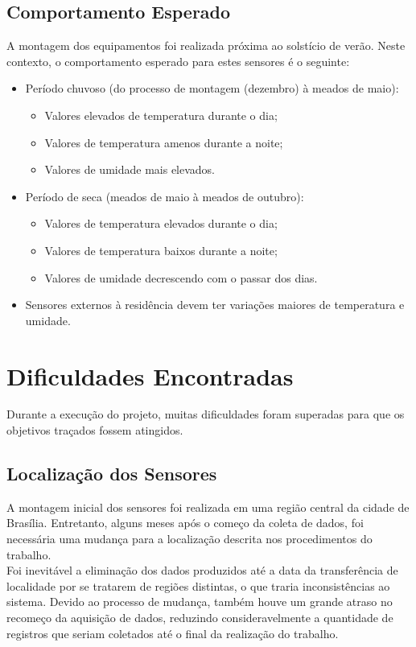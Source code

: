 
\subsection{Comportamento Esperado}
\quad A montagem dos equipamentos foi realizada próxima ao solstício de verão. Neste contexto, o comportamento esperado para estes sensores é o seguinte:
\begin{itemize}
  \item Período chuvoso (do processo de montagem (dezembro) à meados de maio):
  \begin{itemize}
    \item Valores elevados de temperatura durante o dia;
    \item Valores de temperatura amenos durante a noite;
    \item Valores de umidade mais elevados.

  \end{itemize}
  \item Período de seca (meados de maio à meados de outubro):
  \begin{itemize}
    \item Valores de temperatura elevados durante o dia;
    \item Valores de temperatura baixos durante a noite;
    \item Valores de umidade decrescendo com o passar dos dias.
  \end{itemize}
  \item Sensores externos à residência devem ter variações maiores de temperatura e umidade.
\end{itemize}

\section{Dificuldades Encontradas}
\label{sec:dificuldades}
\quad Durante a execução do projeto, muitas dificuldades foram superadas para que os objetivos traçados fossem atingidos.
\subsection{Localização dos Sensores}
\quad A montagem inicial dos sensores foi realizada em uma região central da cidade de Brasília. Entretanto, alguns meses após o começo da coleta de dados, foi necessária uma mudança para a localização descrita nos procedimentos do trabalho.
\\\null \quad Foi inevitável a eliminação dos dados produzidos até a data da transferência de localidade por se tratarem de regiões distintas, o que traria inconsistências ao sistema. Devido ao processo de mudança, também houve um grande atraso no recomeço da aquisição de dados, reduzindo consideravelmente a quantidade de registros que seriam coletados até o final da realização do trabalho.

